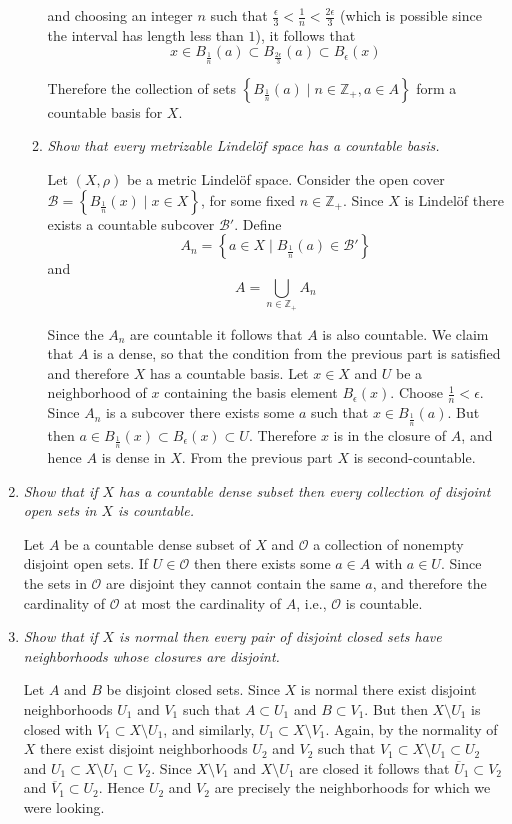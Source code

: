 \documentclass[10pt]{article}
\newcommand{\Z}{\mathbb{Z}}
\begin{document}
\begin{enumerate}
\begin{enumerate}
and choosing an integer $n$ such that $\frac{\epsilon}{3} < \frac{1}{n} < \frac{2\epsilon}{3}$ (which is possible since the interval has length less than $1$), it follows that $$x \in B_\frac{1}{n}(a) \subset B_\frac{2\epsilon}{3}(a) \subset B_\epsilon(x)$$

Therefore the collection of sets $\left\{B_\frac{1}{n}(a) \mid n \in \Z_+, a \in A\right\}$ form a countable basis for $X$.

\item \emph{Show that every metrizable Lindel\"{o}f space has a countable basis.}

Let $(X, \rho)$ be a metric Lindel\"{o}f space.  Consider the open cover $\mathcal{B} = \left\{B_\frac{1}{n}(x) \mid x \in X\right\}$, for some fixed $n \in \Z_+$.  Since $X$ is Lindel\"{o}f there exists a countable subcover $\mathcal{B}'$.  Define $$A_n = \left\{a \in X \mid B_\frac{1}{n}(a) \in \mathcal{B}'\right\}$$ and $$A = \bigcup_{n \in \Z_+} A_n$$

Since the $A_n$ are countable it follows that $A$ is also countable.  We claim that $A$ is a dense, so that the condition from the previous part is satisfied and therefore $X$ has a countable basis.  Let $x \in X$ and $U$ be a neighborhood of $x$ containing the basis element $B_\epsilon(x)$.  Choose $\frac{1}{n} < \epsilon$.  Since $A_n$ is a subcover there exists some $a$ such that $x \in B_\frac{1}{n}(a)$.  But then $a \in B_\frac{1}{n}(x) \subset B_\epsilon(x) \subset U$.  Therefore $x$ is in the closure of $A$, and hence $A$ is dense in $X$.  From the previous part $X$ is second-countable.
\end{enumerate}

\item \emph{Show that if $X$ has a countable dense subset then every collection of disjoint open sets in $X$ is countable.}

Let $A$ be a countable dense subset of $X$ and $\mathcal{O}$ a collection of nonempty disjoint open sets.  If $U \in \mathcal{O}$ then there exists some $a \in A$ with $a \in U$.  Since the sets in $\mathcal{O}$ are disjoint they cannot contain the same $a$, and therefore the cardinality of $\mathcal{O}$ at most the cardinality of $A$, i.e., $\mathcal{O}$ is countable.

\item \emph{Show that if $X$ is normal then every pair of disjoint closed sets have neighborhoods whose closures are disjoint.}

Let $A$ and $B$ be disjoint closed sets.  Since $X$ is normal there exist disjoint neighborhoods $U_1$ and $V_1$ such that $A \subset U_1$ and $B \subset V_1$.  But then $X \setminus U_1$ is closed with $V_1 \subset X \setminus U_1$, and similarly, $U_1 \subset X \setminus V_1$.  Again, by the normality of $X$ there exist disjoint neighborhoods $U_2$ and $V_2$ such that $V_1 \subset X \setminus U_1 \subset U_2$ and $U_1 \subset X \setminus U_1 \subset V_2$.  Since $X \setminus V_1$ and $X \setminus U_1$ are closed it follows that $\overline{U}_1 \subset V_2$ and $\overline{V}_1 \subset U_2$.  Hence $U_2$ and $V_2$ are precisely the neighborhoods for which we were looking.


\end{enumerate}
\end{document}
